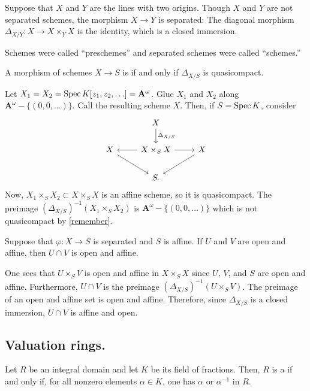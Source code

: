 \documentclass [11 pt, oneside] {article}
\begin{document}
\begin{example}[ ]\label{}\text{}
Suppose that $X$ and $Y$ are the lines with two origins. Though $X$ and $Y$ are not separated schemes, the morphism $X\longrightarrow Y$ is separated: The diagonal morphism $\Delta_{X/Y} :X\longrightarrow X\times_YX$ is the identity, which is a closed immersion.
\end{example}

\begin{remark}
	Schemes were called ``preschemes'' and separated schemes were called ``schemes.''
\end{remark}

\begin{definition}
	A morphism of schemes $X\longrightarrow S$ is  if and only if $\Delta_{X/S}$ is quasicompact.
\end{definition}

\begin{example}[ ]\label{}\text{}
Let $X_1=X_2 = \operatorname{Spec} K[z_1,z_2,\hdots]= \mathbf{A}^\omega$. Glue $X_1$ and $X_2$ along $\mathbf{A}^\omega - \{(0,0,\hdots) \}$. Call the resulting scheme $X$. Then, if $S=\operatorname{Spec} K$, consider 
\[
\begin{tikzcd}
	&X \ar[d, "\Delta_{X/S}"]\\
	X\ar[dr] & X\times_SX \ar[l]\ar[r] & X\ar[dl]\\
		 & S.
\end{tikzcd}
\]
Now, $X_1\times_S X_2\subset X\times_S X$ is an affine scheme, so it is quasicompact. The preimage $(\Delta_{X/S}) ^{-1} (X_1\times_S X_2)$ is $\mathbf{A}^\omega - \{(0,0,\hdots) \}$ which is not quasicompact by \cref{remember}. 
\end{example}

Suppose that $\varphi : X\longrightarrow S$ is separated and $S$ is affine. If $U$ and $V$ are open and affine, then $U\cap V$ is open and affine.

One sees that $U\times_SV$ is open and affine in $X\times_SX$ since $U$, $V$, and $S$ are open and affine. Furthermore, $U\cap V$ is the preimage $(\Delta_{X/S}) ^{-1} (U\times_S V)$. The preimage of an open and affine set is open and affine. Therefore, since $\Delta_{X/S}$ is a closed immersion, $U\cap V$ is affine and open.

\subsection{Valuation rings.}
Let $R$ be an integral domain and let $K$ be its field of fractions. Then, $R$ is a  if and only if, for all nonzero elements $\alpha\in K$, one has $\alpha$ or $\alpha^{-1}$ in $R$.
\end{document}
